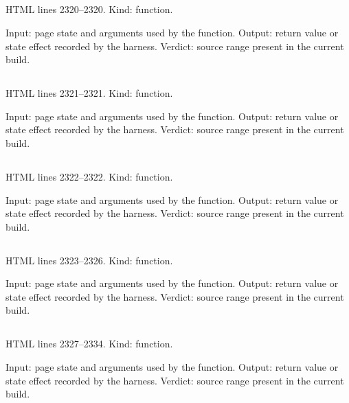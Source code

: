 \subsection*{\texttt{}}
\label{vf_55_base64ToBytes}
HTML lines 2320--2320. Kind: function.

Input: page state and arguments used by the function.
Output: return value or state effect recorded by the harness.
Verdict: source range present in the current build.

\subsection*{\texttt{}}
\label{vf_56_posToWell}
HTML lines 2321--2321. Kind: function.

Input: page state and arguments used by the function.
Output: return value or state effect recorded by the harness.
Verdict: source range present in the current build.

\subsection*{\texttt{}}
\label{vf_57_posToLimsWell}
HTML lines 2322--2322. Kind: function.

Input: page state and arguments used by the function.
Output: return value or state effect recorded by the harness.
Verdict: source range present in the current build.

\subsection*{\texttt{}}
\label{vf_58_wellToPos}
HTML lines 2323--2326. Kind: function.

Input: page state and arguments used by the function.
Output: return value or state effect recorded by the harness.
Verdict: source range present in the current build.

\subsection*{\texttt{}}
\label{vf_59_hexBEToDouble}
HTML lines 2327--2334. Kind: function.

Input: page state and arguments used by the function.
Output: return value or state effect recorded by the harness.
Verdict: source range present in the current build.

